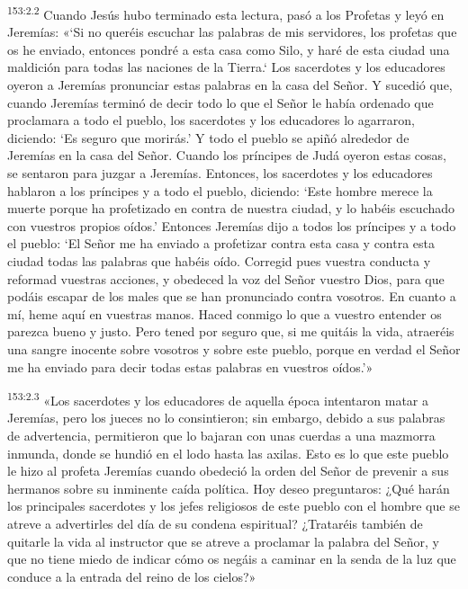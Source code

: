 \par 
\textsuperscript{153:2.2} Cuando Jesús hubo terminado esta lectura, pasó a los Profetas y leyó en Jeremías: «`Si no queréis escuchar las palabras de mis servidores, los profetas que os he enviado, entonces pondré a esta casa como Silo, y haré de esta ciudad una maldición para todas las naciones de la Tierra.` Los sacerdotes y los educadores oyeron a Jeremías pronunciar estas palabras en la casa del Señor. Y sucedió que, cuando Jeremías terminó de decir todo lo que el Señor le había ordenado que proclamara a todo el pueblo, los sacerdotes y los educadores lo agarraron, diciendo: `Es seguro que morirás.' Y todo el pueblo se apiñó alrededor de Jeremías en la casa del Señor. Cuando los príncipes de Judá oyeron estas cosas, se sentaron para juzgar a Jeremías. Entonces, los sacerdotes y los educadores hablaron a los príncipes y a todo el pueblo, diciendo: `Este hombre merece la muerte porque ha profetizado en contra de nuestra ciudad, y lo habéis escuchado con vuestros propios oídos.' Entonces Jeremías dijo a todos los príncipes y a todo el pueblo: `El Señor me ha enviado a profetizar contra esta casa y contra esta ciudad todas las palabras que habéis oído. Corregid pues vuestra conducta y reformad vuestras acciones, y obedeced la voz del Señor vuestro Dios, para que podáis escapar de los males que se han pronunciado contra vosotros. En cuanto a mí, heme aquí en vuestras manos. Haced conmigo lo que a vuestro entender os parezca bueno y justo. Pero tened por seguro que, si me quitáis la vida, atraeréis una sangre inocente sobre vosotros y sobre este pueblo, porque en verdad el Señor me ha enviado para decir todas estas palabras en vuestros oídos.'»

\par 
\textsuperscript{153:2.3} «Los sacerdotes y los educadores de aquella época intentaron matar a Jeremías, pero los jueces no lo consintieron; sin embargo, debido a sus palabras de advertencia, permitieron que lo bajaran con unas cuerdas a una mazmorra inmunda, donde se hundió en el lodo hasta las axilas. Esto es lo que este pueblo le hizo al profeta Jeremías cuando obedeció la orden del Señor de prevenir a sus hermanos sobre su inminente caída política. Hoy deseo preguntaros: ¿Qué harán los principales sacerdotes y los jefes religiosos de este pueblo con el hombre que se atreve a advertirles del día de su condena espiritual? ¿Trataréis también de quitarle la vida al instructor que se atreve a proclamar la palabra del Señor, y que no tiene miedo de indicar cómo os negáis a caminar en la senda de la luz que conduce a la entrada del reino de los cielos?»

